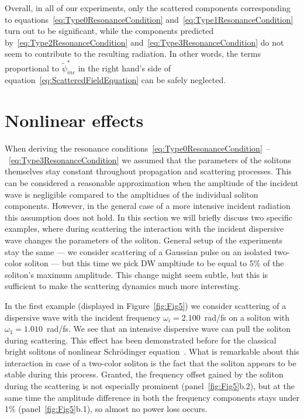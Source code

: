 \documentclass[aps, prl, twocolumn, superscriptaddress, final]{revtex4}
\begin{document}
Overall, in all of our experiments, only the scattered components corresponding to equations~\eqref{eq:Type0ResonanceCondition} and~\eqref{eq:Type1ResonanceCondition} turn out to be significant, while the components predicted by~\eqref{eq:Type2ResonanceCondition} and~\eqref{eq:Type3ResonanceCondition} do not seem to contribute to the resulting radiation. In other words, the terms proportional to $\tilde \psi_{inc}^{*}$ in the right hand's side of equation~\eqref{eq:ScatteredFieldEquation} can be safely neglected.

\section{Nonlinear effects}

When deriving the resonance conditions~\eqref{eq:Type0ResonanceCondition}~--~\eqref{eq:Type3ResonanceCondition} we assumed that the parameters of the solitons themselves stay constant throughout propagation and scattering processes. This can be considered a reasonable approximation when the ampltiude of the incident wave is negligible compared to the ampltidues of the individual soliton components. However, in the general case of a more intensive incident radiation this assumption does not hold. In this section we will briefly discuss two specific examples, where during scattering the interaction with the incident dispersive wave changes the parameters of the soliton. General setup of the experiments stay the same --- we consider scattering of a Gaussian pulse on an isolated two-color soliton --- but this time we pick DW ampltiude to be equal to 5\% of the soliton's maximum amplitude. This change might seem subtle, but this is sufficient to make the scattering dynamics much more interesting.

In the first example (displayed in Figure~\ref{fig:Fig5}) we consider scattering of a dispersive wave with the incident frequency $\omega_{i} = 2.100$~rad/fs on a soliton with $\omega_{1} = 1.010$~rad/fs. We see that an intensive dispersive wave can pull the soliton during scattering. This effect has been demonstrated before for the classical bright solitons of nonlinear Schr\"odinger equation~\cite{demircan2011controlling, tartara2015soliton}. What is remarkable about this interaction in case of a two-color soliton is the fact that the soliton appears to be stable during this process. Granted, the frequency offset gained by the soliton during the scattering is not especially prominent (panel~\ref{fig:Fig5}b.2), but at the same time the amplitude difference in both the frequency components stays under 1\% (panel~\ref{fig:Fig5}b.1), so almost no power loss occurs.
\end{document}
